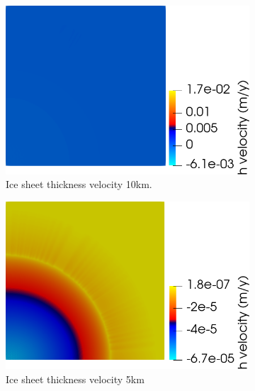 \documentclass{article}
\begin{document}
\begin{figure}[!h]
\begin{minipage}[t]{.45\textwidth}
\begin{subfigure}{\textwidth}
			\includegraphics[width=\linewidth]{../fig/10km_quarter_cone_hvelocity_sin_fondo.png}
			\caption{Ice sheet thickness velocity 10km.}
			\label{hvelocity10km}
		\end{subfigure}\hfil %
		\begin{subfigure}{\textwidth}
			\includegraphics[width=\linewidth]{../fig/5km_quarter_cone_hvelocity_sin_fondo.png}
			\caption{Ice sheet thickness velocity 5km}
			\label{hvelocity5km}
		\end{subfigure}\hfil %
		\begin{subfigure}{\textwidth}

\end{subfigure}
\end{minipage}
\end{figure}
\end{document}
